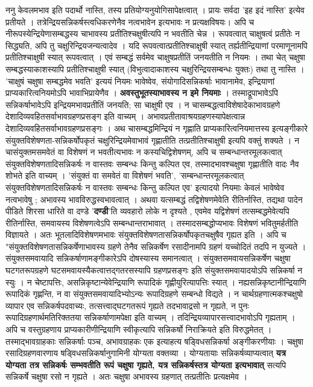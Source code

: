 ननु केवलमभाव इति पदार्थो नास्ति, तस्य प्रतियोग्यनुयोगिसापेक्षत्वात् । प्रायः सर्वदा 'इह इदं नास्ति' इत्येव प्रतीयते । तत्रेन्द्रियसन्निकर्षस्त्वधिकरणेनैव नत्वभावेन इत्यभावः न प्रत्यक्षविषयः। अपि च नीरूपस्येन्द्रियेणासम्बद्धस्य चाभावस्य प्रतीतिश्चक्षुषीत्यपि न भवतीति चेन्न । रूपवत्वात् चाक्षुषत्वं प्रतीतेः न सिद्ध्यति, अपि तु चक्षुरिन्द्रियजन्यत्वादेव । यदि रूपवत्वात्प्रतीतिश्चाक्षुषी स्यात् तर्ह्यतीन्द्रियाणां परमाणूनामपि प्रतीतिश्चाक्षुषी स्यात् रूपवत्वात् । एवं सम्बद्धं सर्वमेव चाक्षुषप्रतीतिं जनयतीति न नियमः । तथा चेत् चक्षुषा सम्बद्धस्याकाशस्यापि प्रतीतिश्चाक्षुषी स्यात् (विभुत्वादाकाशस्य चक्षुरिन्द्रियसम्बन्धः युक्तः) तथा तु नास्ति । 'चाक्षुषं चक्षुषा सम्बद्धमेव भवति' इत्ययं नियमः भावेष्वेव, संयोगादिसन्निकर्षाः भावानामेव, इन्द्रियाणां प्राप्यकारित्वनियमोऽपि भावाभिप्रायेणैव । \textbf{अवस्तुभूतस्याभावस्य न इमे नियमाः} । तस्माद्रूपाभावेऽपि सन्निकर्षाभावेऽपि इन्द्रियमभावप्रतीतिं जनयति; सा चाक्षुषी एव । न चासम्बद्धत्वाविशेषादेकाभावग्रहणे देशादिव्यवहितसर्वाभावग्रहणप्रसङ्‌ग इति वाच्यम् । अभावप्रतीतावाश्रयग्रहणस्यापेक्षत्वान्न देशादिव्यवहितसर्वाभावग्रहणप्रसङ्गः । अथ चासम्बद्धमिन्द्रियं न गृह्णाति प्राप्यकारित्वनियमात्तस्य इत्यङ्गीकारे संयुक्तविशेषणता-सन्निकर्षोपकृतं चक्षुरिन्द्रियमेवाभावं गृह्णातीति तत्प्रतीतिश्चाक्षुषी इत्यपि वक्तुं शक्यते । न चासंयुक्तमसमवेतं वा विशेषणं न भवतीत्यभावः न कस्यचिद्विशेषणम्, अपि च सम्बन्धान्तरमूलकत्वात् संयुक्तविशेषणतादिसन्निकर्षः न वास्तवः सम्बन्धः किन्तु कल्पित एव, तस्मादभावश्चक्षुषा गृह्णातीति वादः नैव शोभते इति वाच्यम् । 'संयुक्तं वा समवेतं वा विशेषणं भवति', 'सम्बन्धान्तरमूलकत्वात् संयुक्तविशेषणतादिसन्निकर्षः न वास्तवः सम्बन्धः किन्तु कल्पित एव' इत्यादयो नियमाः केवलं भावेष्वेव नत्वभावेषु ; अभावस्य भावविरुद्धस्वभावत्वात् । अथवा यत्सम्बद्धं तद्विशेषणमेवेति रीतिर्नास्ति, तद्यथा पादेन पीडिते शिरसा धारिते वा दण्डे '\textbf{दण्डी}'ति व्यवहारो लोके न दृश्यते , एवमेव यद्विशेषणं तत्सम्बद्धमेवेत्यपि रीतिर्नास्ति, समवायस्य विशेषणत्वेऽपि सम्बन्धान्तराभावात् । तस्मादसम्बद्धोप्यभावः विशेषणं भवितुमर्हतीति विज्ञायते । अतः भूतलादिविशेषणमभावः संयुक्तविशेषणतासन्निकर्षोपकृतचक्षुषैव गृह्यत इति । अपि च "संयुक्तविशेषणतासन्निकर्षेणाभावस्य ग्रहणे तेनैव सन्निकर्षेण रसादीनामपि ग्रहणं यच्चोदितं तदपि न युज्यते । संयुक्तसमवायादि सन्निकर्षाणामङ्गीकारेऽपि दोषस्यास्य समानत्वात् । संयुक्तसमवायसन्निकर्षेण चक्षुषा घटगतरूपग्रहणे घटसमवायस्यैकत्वात्तद्गतरसस्यापि ग्रहणप्रसङ्गः इति संयुक्तसमवायादयोऽपि सन्निकर्षा न स्युः । न चेष्टापत्तिः, असन्निकृष्टान्येवेन्द्रियाणि रूपादिकं गृह्णीयुरित्यापत्तिः स्यात् । नह्यसन्निकृष्टानीन्द्रियाणि रूपादिकं गृह्णन्ति, न वा संयुक्तसमवायादिभ्योऽन्यः रूपादिग्रहणे सम्बन्धो विद्यते । न चार्थग्रहणात्मकश्चक्षुषो व्यापार एव सन्निकर्षपदवाच्यः, तत्सत्त्वाद्घटगतरूपं गृह्यते तदभावाद्रसो न गृह्यते, न पुनः रूपादिग्रहणार्थमतिरिक्ततया सन्निकर्षाणामपेक्षा इति वाच्यम् । तदिन्द्रियव्यापारसत्त्वादभावोऽपि गृह्यताम् । अपि च वस्तुग्रहणाय प्राप्यकारीणीन्द्रियाणि स्वीकृत्यापि सन्निकर्षो निराक्रियते इति विरुद्धमेतत् । तस्माद्भावग्राहकाः सन्निकर्षाः पञ्च, अभावग्राहकः एक इत्याहत्य षड्विधसन्निकर्षा अङ्गीकरणीयाः । चक्षुषा रसादिग्रहणवारणाय षड्विधसन्निकर्षानुगामिनी योग्यता वक्तव्या । योग्यतायाः सन्निकर्षव्याप्यत्वात् \textbf{यत्र योग्यता तत्र सन्निकर्षः सम्भवतीति रूपं चक्षुषा गृह्यते, यत्र सन्निकर्षस्तत्र योग्यता इत्यभावात्} सत्यपि सन्निकर्षे चक्षुषा रसो न गृह्यते । अतः चक्षुषा अभावस्य ग्रहणात् तत्प्रतीतिः प्रत्यक्षमेव । 

